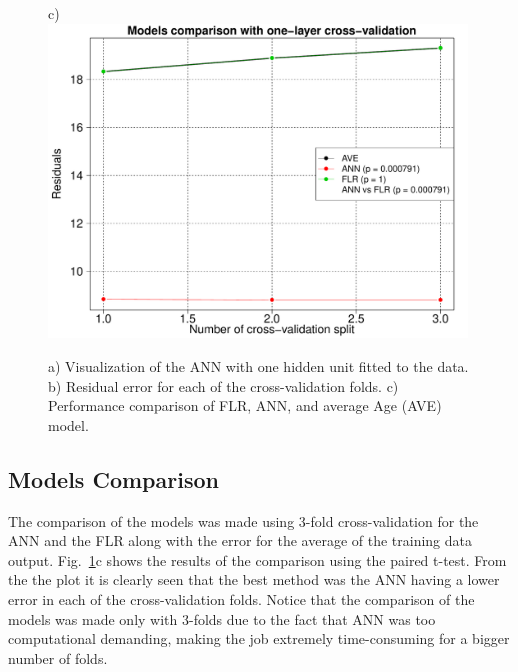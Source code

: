 \documentclass[10pt, paper=a4]{article}
\begin{document}
\begin{figure}[h]
\begin{minipage}{0.3\textwidth}
  \end{minipage} \hfill
  \begin{minipage}{0.3\textwidth}
    c)\\
    \includegraphics[width = 0.99\textwidth]{Regression_comparison1.pdf}
  \end{minipage} \vfill
  \caption{a) Visualization of the ANN with one hidden unit fitted to
    the data.  b) Residual error for each of the cross-validation
    folds.  c) Performance
    comparison of FLR, ANN, and average Age (AVE) model.}
  \label{fig:ann_lr}
\end{figure}


\subsection{Models Comparison}
The comparison of the models was made using 3-fold cross-validation
for the ANN and the FLR along with the
error for the average of the training data output.
Fig.~\ref{fig:ann_lr}c shows the results of the comparison using the
paired t-test.  From the the plot it is clearly seen that the best
method was the ANN having a lower error in each of the
cross-validation folds.  Notice that the comparison of the models was
made only with 3-folds due to the fact that ANN was too computational
demanding, making the job extremely time-consuming for a bigger number
of folds.

\end{document}
